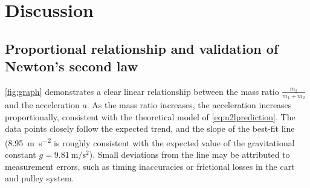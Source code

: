 ﻿\documentclass[reprint,amsmath,amssymb,aps,twoside]{revtex4-2}
\begin{document}
%
%
%
%








\section{Discussion}
\subsection{Proportional relationship and validation of Newton's second law}
\cref{fig:graph} demonstrates a clear linear relationship between the mass ratio $ \frac{m_2}{m_1 + m_2}$ and the acceleration $a$. As the mass ratio increases, the acceleration increases proportionally, consistent with the theoretical model of \cref{eq:n2lprediction}. The data points closely follow the expected trend, and the slope of the best-fit line (\qty{8.95}{\meter\per\second\squared} is roughly consistent with the expected value of the gravitational constant $g=\qty{9.81}{\meter\per\second\squared}$). Small deviations from the line may be attributed to measurement errors, such as timing inaccuracies or frictional losses in the cart and pulley system. 
\end{document}
